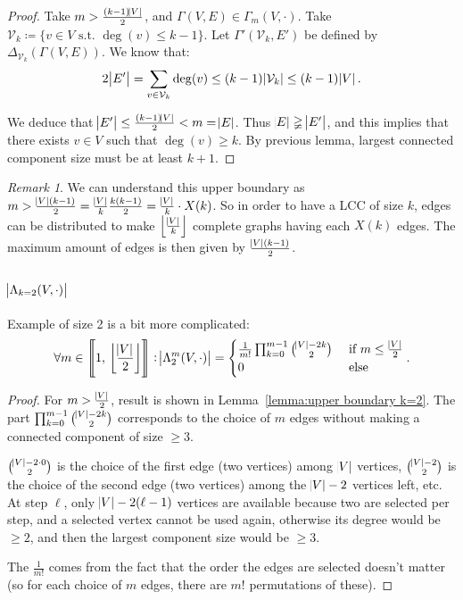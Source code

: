 \documentclass{article}
\theoremstyle{definition}
\theoremstyle{remark}
\newtheorem*{remark}{Remark}
\newcommand{\intint}[2]{\left\llbracket#1, \, #2\right\rrbracket}
\newcommand{\floor}[1]{\left\lfloor#1\right\rfloor}
\newcommand{\st}{\text{ s.t. }}
\begin{document}
		\begin{proof} Take $m > \frac {(k-1)\abs V}2$, and $\Gamma(V, E) \in \Gamma_m(V, \cdot)$. Take $\mathcal V_k \coloneqq \{v \in V \st \deg(v) \leq k-1\}$.
		Let $\Gamma'(\mathcal V_k, E')$ be defined by $\Delta_{\mathcal V_k}(\Gamma(V, E))$. We know that:
		\[2\abs {E'} = \sum_{v \in \mathcal V_k}\deg(v) \leq (k-1)\abs {\mathcal V_k} \leq (k-1)\abs V.\]

		We deduce that $\abs {E'} \leq \frac {(k-1)\abs V}2 < m = \abs E$. Thus $\abs E \gneqq \abs {E'}$, and this implies that there exists $v \in V$ such that $\deg(v) \geq k$.
		By previous lemma, largest connected component size must be at least $k+1$.
		\end{proof}

		\begin{remark} We can understand this upper boundary as $m > \frac {\abs V(k-1)}2 = \frac {\abs V}k\frac {k(k-1)}2 = \frac {\abs V}k \cdot X(k)$. So in
		order to have a LCC of size $k$, edges can be distributed to make $\floor {\frac {\abs V}k}$ complete graphs having each $X(k)$ edges.
		The maximum amount of edges is then given by $\frac {\abs V(k-1)}2$.
		\end{remark}

	\subsection{$\abs {\Lambda_{k=2}(V, \cdot)}$}
		Example of size 2 is a bit more complicated:
		\[\forall m \in \intint 1{\floor {\frac {\abs V}2}} : \abs {\Lambda_2^m(V, \cdot)} = \begin{cases}
			\frac 1{m!}\prod_{k=0}^{m-1}\binom {\abs V-2k}2 &\text{ if } m \leq \frac {\abs V}2 \\
			0 &\text{ else}
		\end{cases}.\]

		\begin{proof} For $m > \frac {\abs V}2$, result is shown in Lemma~\ref{lemma:upper boundary k=2}. The part $\prod_{k=0}^{m-1}\binom {\abs V-2k}2$ corresponds
		to the choice of $m$ edges without making a connected component of size $\geq 3$.

		$\binom {\abs V-2 \cdot 0}2$ is the choice of the first edge (two vertices) among $\abs V$ vertices, $\binom {\abs V-2}2$ is the choice of the second edge
		(two vertices) among the $\abs V-2$ vertices left, etc. At step $\ell$, only $\abs V-2(\ell-1)$ vertices are available because two are selected per step, and
		a selected vertex cannot be used again, otherwise its degree would be $\geq 2$, and then the largest component size would be $\geq 3$.

		The $\frac 1{m!}$ comes from the fact that the order the edges are selected doesn't matter (so for each choice of $m$ edges, there are $m!$ permutations
		of these).
		\end{proof}
\end{document}
